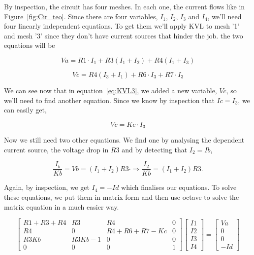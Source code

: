 \par By inspection, the circuit has four meshes. In each one, the current flows like in Figure~\ref{fig:Cir_teo}. Since there are four variables, $I_1$, $I_2$, $I_3$ and $I_4$, we'll need four linearly independent equations. To get them we'll apply KVL to mesh '1' and mesh '3' since they don't have current sources that hinder the job. the two equations will be

\begin{equation}
  Va = R1 \cdot I_1+R3(I_1 + I_2) + R4(I_1 + I_3)
  \label{eq:KVL1}
\end{equation}

\begin{equation}
  Vc = R4(I_3 + I_1) + R6 \cdot I_3 + R7 \cdot I_3
  \label{eq:KVL3}
\end{equation}

\par We can see now that in equation~\ref{eq:KVL3}, we added a new variable, $Vc$, so we'll need to find another equation. Since we know by inspection that $Ic=I_3$, we can easily get,

\begin{equation}
  Vc = Kc \cdot I_3
  \label{eq:Vc}
\end{equation}

\par Now we still need two other equations. We find one by analysing the dependent current source, the voltage drop in $R3$ and by detecting that $I_2=Ib$,

 \begin{equation}
  \frac{I_b}{Kb} = Vb = (I_1 + I_2)R3 \cdot \Rightarrow \frac{I_2}{Kb} = (I_1 + I_2)R3.
  \label{eq:Vb}
\end{equation}

\par Again, by inspection, we get $I_4 = -Id$ which finalises our equations.
To solve these equations, we put them in matrix form and then use octave to solve the matrix equation in a much easier way.

$$
\begin{bmatrix}
R1+R3+R4 & R3 & R4 & 0 \\
R4 & 0 & R4+R6+R7-Kc & 0 \\
R3Kb & R3Kb-1 & 0 & 0 \\
0 & 0 & 0 & 1 
\end{bmatrix}
\begin{bmatrix}
I1 \\
I2 \\
I3 \\
I4 
\end{bmatrix}
=
\begin{bmatrix}
Va \\
0 \\
0 \\
-Id
\end{bmatrix}
$$

